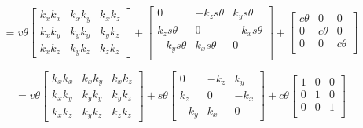 \documentclass[a4paper]{article}
\begin{document}
\begin{qalist}
		\begin{equation} = 
				v\theta\left[ \begin{matrix} 
					\textit{${k}_{x}{k}_{x}$} & \textit{${k}_{x}{k}_{y}$} & \textit{${k}_{x}{k}_{z}$} \\
					\textit{${k}_{x}{k}_{y}$} & \textit{${k}_{y}{k}_{y}$} & \textit{${k}_{y}{k}_{z}$} \\
					\textit{${k}_{x}{k}_{z}$} & \textit{${k}_{y}{k}_{z}$} & \textit{${k}_{z}{k}_{z}$} 
				\end{matrix} \right]
				+
				\left[ \begin{matrix} 
					\textit{0} & \textit{$- {k}_{z}s\theta$} & \textit{${k}_{y}s\theta$} \\
					\textit{${k}_{z}s\theta$} & \textit{0} & \textit{$- {k}_{x}s\theta$} \\
					\textit{$- {k}_{y}s\theta$} & \textit{${k}_{x}s\theta$} & \textit{0} \\
				\end{matrix} \right]
				+
				\left[ \begin{matrix} 
					\textit{$c\theta$} & \textit{0} & \textit{0} \\
					\textit{0} & \textit{$c\theta$} & \textit{0} \\
					\textit{0} & \textit{0} & \textit{$c\theta$} \\
				\end{matrix} \right]
		\end{equation}
		
		
		\begin{equation} = 
				v\theta\left[ \begin{matrix} 
					\textit{${k}_{x}{k}_{x}$} & \textit{${k}_{x}{k}_{y}$} & \textit{${k}_{x}{k}_{z}$} \\
					\textit{${k}_{x}{k}_{y}$} & \textit{${k}_{y}{k}_{y}$} & \textit{${k}_{y}{k}_{z}$} \\
					\textit{${k}_{x}{k}_{z}$} & \textit{${k}_{y}{k}_{z}$} & \textit{${k}_{z}{k}_{z}$} 
				\end{matrix} \right]
				+
				s\theta\left[ \begin{matrix} 
					\textit{0} & \textit{$- {k}_{z}$} & \textit{${k}_{y}$} \\
					\textit{${k}_{z}$} & \textit{0} & \textit{$- {k}_{x}$} \\
					\textit{$- {k}_{y}$} & \textit{${k}_{x}$} & \textit{0}
				\end{matrix} \right]
				+
				c\theta\left[ \begin{matrix} 
					\textit{1} & \textit{0} & \textit{0} \\
					\textit{0} & \textit{1} & \textit{0} \\
					\textit{0} & \textit{0} & \textit{1} \\
				\end{matrix} \right]
		\end{equation}
		

\end{qalist}
\end{document}
